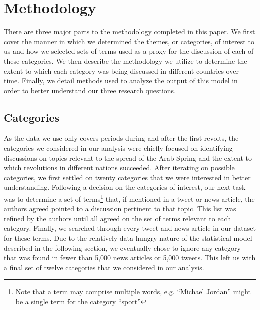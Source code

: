   
\section{Methodology}

There are three major parts to the methodology completed in this paper.  We first cover the manner in which we determined the themes, or categories, of interest to us and how we selected sets of terms used as a proxy for the discussion of each of these categories. We then describe the methodology we utilize to determine the extent to which each category was being discussed in different countries over time. Finally, we detail methods used to analyze the output of this model in order to better understand our three research questions.

\subsection{Categories}

As the data we use only covers periods during and after the first revolts, the categories we considered in our analysis were chiefly focused on identifying discussions on topics relevant to the spread of the Arab Spring and the extent to which revolutions in different nations succeeded.  After iterating on possible categories, we first settled on twenty categories that we were interested in better understanding. Following a decision on the categories of interest, our next task was to determine a set of terms\footnote{Note that a term may comprise multiple words, e.g. ``Michael Jordan'' might be a single term for the category ``sport''} that, if mentioned in a tweet or news article, the authors agreed pointed to a discussion pertinent to that topic.  This list was refined by the authors until all agreed on the set of terms relevant to each category. Finally, we searched through every tweet and news article in our dataset for these terms.  Due to the relatively data-hungry nature of the statistical model described in the following section, we eventually chose to ignore any category that was found in fewer than 5,000 news articles or 5,000 tweets.  This left us with a final set of twelve categories that we considered in our analysis.

